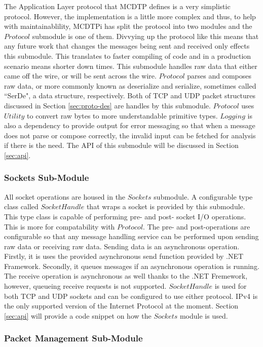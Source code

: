 The Application Layer protocol that MCDTP defines is a very simplistic protocol. However, the implementation is a little more complex and thus, to help with maintainablility, MCDTPi has split the protocol into two modules and the $Protocol$ submodule is one of them. Divvying up the protocol like this means that any future work that changes the messages being sent and received only effects this submodule. This translates to faster compiling of code and in a production scenario means shorter down times. This submodule handles raw data that either came off the wire, or will be sent across the wire. $Protocol$ parses and composes raw data, or more commonly known as deserialize and serialize, sometimes called ``SerDe", a data structure, respectively. Both of TCP and UDP packet structures discussed in Section \ref{sec:proto-des} are handles by this submodule. $Protocol$ uses $Utility$ to convert raw bytes to more understandable primitive types. $Logging$ is also a dependency to provide output for error messaging so that when a message does not parse or compose correctly, the invalid input can be fetched for analysis if there is the need. The API of this submodule will be discussed in Section \ref{sec:api}.

\subsubsection{Sockets Sub-Module}

All socket operations are housed in the $Sockets$ submodule. A configurable type class called $SocketHandle$ that wraps a socket is provided by this submodule. This type class is capable of performing pre- and post- socket I/O operations. This is more for compatability with $Protocol$. The pre- and post-operations are configurable so that any message handling service can be performed upon sending raw data or receiving raw data. Sending data is an asynchronous operation. Firstly, it is uses the provided asynchronous send function provided by .NET Framework. Secondly, it queues messages if an asynchronous operation is running. The receive operation is asynchronous as well thanks to the .NET Fremework, however, queueing receive requests is not supported. $SocketHandle$ is used for both TCP and UDP sockets and can be configured to use either protocol. IPv4 is the only supported version of the Internet Protocol at the moment. Section \ref{sec:api} will provide a code snippet on how the $Sockets$ module is used.

\subsubsection{Packet Management Sub-Module}\label{sec:pm-sm}


